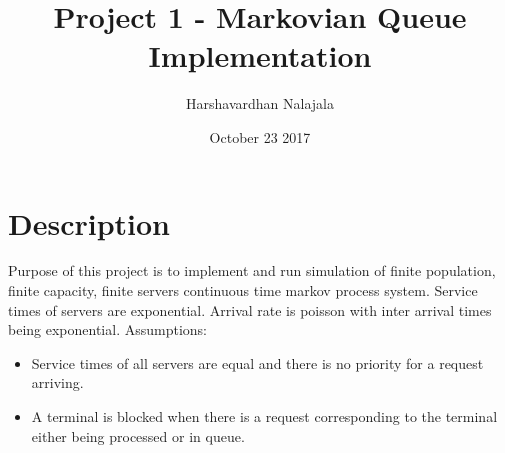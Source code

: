 \documentclass[11pt]{article}
\title{Project 1 - Markovian Queue Implementation}
\author{Harshavardhan Nalajala}
\date{October 23 2017}
\begin{document}
\maketitle
 \tableofcontents
 
 \section{Description}
 Purpose of this project is to implement and run simulation of finite population, finite capacity, finite servers continuous time markov process system.
 Service times of servers are exponential. Arrival rate is poisson with inter arrival times being exponential. 
 Assumptions: 
 \begin{itemize}
 \item Service times of all servers are equal and there is no priority for a request arriving.
 \item A terminal is blocked when there is a request corresponding to the terminal either being processed or in queue.
 \end{itemize}
\end{document}

